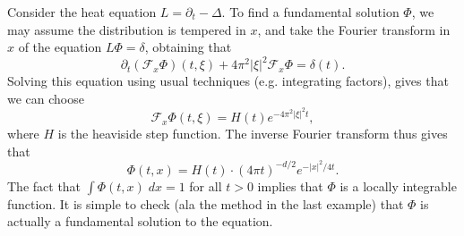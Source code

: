 \begin{example}
    Consider the heat equation $L = \partial_t - \Delta$. To find a fundamental solution $\Phi$, we may assume the distribution is tempered in $x$, and take the Fourier transform in $x$ of the equation $L \Phi = \delta$, obtaining that
    \[ \partial_t (\mathcal{F}_x \Phi)(t,\xi) + 4 \pi^2 |\xi|^2 \mathcal{F}_x \Phi = \delta(t). \]
    Solving this equation using usual techniques (e.g. integrating factors), gives that we can choose
    \[ \mathcal{F}_x \Phi(t,\xi) = H(t) e^{- 4 \pi^2 |\xi|^2 t}, \]
    where $H$ is the heaviside step function. The inverse Fourier transform thus gives that
    \[ \Phi(t,x) = H(t) \cdot (4 \pi t)^{-d/2} e^{- |x|^2 / 4t}. \]
    The fact that $\int \Phi(t,x)\; dx = 1$ for all $t > 0$ implies that $\Phi$ is a locally integrable function. It is simple to check (ala the method in the last example) that $\Phi$ is actually a fundamental solution to the equation.


\end{example}
